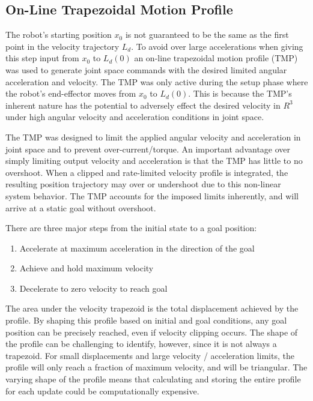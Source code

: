 \subsection{On-Line Trapezoidal Motion Profile}\label{sec:trap}

The robot's starting position $x_0$ is not guaranteed to be the same as the
first point in the velocity trajectory $L_d$.  To avoid over large
accelerations when giving this step input from $x_0$ to $L_d(0)$ an on-line
trapezoidal motion profile (TMP) was used to generate joint space commands with
the desired limited angular acceleration and velocity.  The TMP was only active
during the setup phase where the robot's end-effector moves from $x_0$ to
$L_d(0)$.  This is because the TMP's inherent nature has the potential to adversely effect the desired velocity in $R^3$ under high angular velocity and acceleration conditions in joint space.

The TMP was designed to limit the applied angular velocity and acceleration in
joint space and to prevent over-current/torque. An important advantage over
simply limiting output velocity and acceleration is that the TMP has little to
no overshoot. When a clipped and rate-limited velocity profile is integrated,
the resulting position trajectory may over or undershoot due to this non-linear
system behavior.  The TMP accounts for the imposed limits inherently, and will
arrive at a static goal without overshoot.

There are three major steps from the initial state to a goal position:

\begin{enumerate}
\item Accelerate at maximum acceleration in the direction of the goal
\item Achieve and hold maximum velocity
\item Decelerate to zero velocity to reach goal
\end{enumerate}

The area under the velocity trapezoid is the total displacement achieved by the
profile. By shaping this profile based on initial and goal conditions, any
goal position can be precisely reached, even if velocity clipping occurs. The
shape of the profile can be challenging to identify, however, since it is not
always a trapezoid. For small displacements and large velocity / acceleration
limits, the profile will only reach a fraction of maximum velocity, and will be
triangular. The varying shape of the profile means that calculating and storing
the entire profile for each update could be computationally expensive. 

